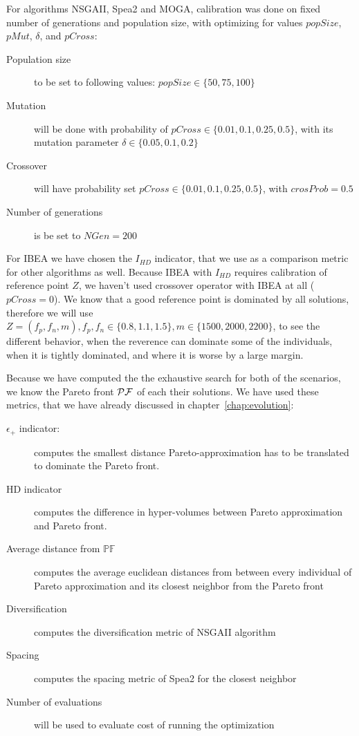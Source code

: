 \documentclass[12pt,oneside]{fithesis2}
\begin{document}
For algorithms NSGAII, Spea2 and MOGA, calibration was done on fixed number of generations and population size, with optimizing for values $popSize$, $pMut$, $\delta$, and $pCross$:

\begin{description}
  \item[Population size] to be set to following values: $popSize \in \{50,75,100\}$
\item[Mutation] will be done with probability of $pCross \in \{0.01,0.1,0.25,0.5\}$, with its mutation parameter $\delta \in \{0.05,0.1,0.2\}$
\item[Crossover] will have probability set $pCross \in \{0.01,0.1,0.25,0.5\}$, with $crosProb = 0.5$
\item[Number of generations] is be set to $NGen=200$ 
\end{description}

For IBEA we have chosen the $I_{HD}$ indicator, that we use as a comparison metric for other algorithms as well. Because IBEA with $I_{HD}$ requires calibration of reference point $Z$, we haven't used crossover operator with IBEA at all ($pCross=0$). We know that a good reference point is dominated by all solutions, therefore we will use $Z = (f_p,f_n,m), f_p,f_n \in \{0.8,1.1,1.5\}, m \in \{1500,2000,2200\}$, to see the different behavior, when the reverence can dominate some of the individuals, when it is tightly dominated, and where it is worse by a large margin.

Because we have computed the the exhaustive search for both of the scenarios, we know the Pareto front $\cal{PF}$ of each their solutions. We have used these metrics, that we have already discussed in chapter~\ref{chap:evolution}:

\begin{description}
  \item[$\epsilon_+$ indicator:] computes the smallest distance Pareto-approximation has to be translated to dominate the Pareto front.
  \item[HD indicator] computes the difference in hyper-volumes between Pareto approximation and Pareto front.
  \item[Average distance from $\mathbb{PF}$] computes the average euclidean distances from between every individual of Pareto approximation and its closest neighbor from the Pareto front
  \item[Diversification] computes the diversification metric of NSGAII algorithm
  \item[Spacing] computes the spacing metric of Spea2 for the closest neighbor
  \item[Number of evaluations] will be used to evaluate cost of running the optimization
\end{description}
 
\end{document}
